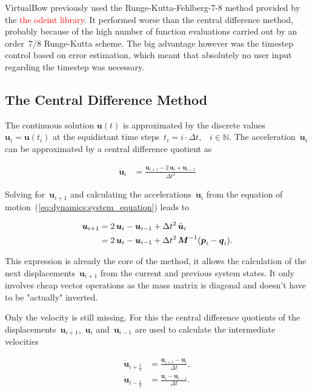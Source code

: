 VirtualBow previously used the Runge-Kutta-Fehlberg-7-8 method provided by the \textcolor{red}{the odeint library}.
It performed worse than the central difference method, probably because of the high number of function evaluations carried out by an order~7/8 Runge-Kutta scheme.
The big advantage however was the timestep control based on error estimation, which meant that absolutely no user input regarding the timestep was necessary.

\subsection{The Central Difference Method}

The continuous solution $\boldsymbol{u}(t)$ is approximated by the discrete values~$\boldsymbol{u}_i = \boldsymbol{u}(t_{i})$ at the equidistant time steps~$t_i = i\cdot\Delta t$,\ \ $i \in \mathbb{N}$.
The acceleration~$\ddot{\boldsymbol{u}}_i$ can be approximated by a central difference quotient as

\begin{align}
\ddot{\boldsymbol{u}}_i &= \frac{\boldsymbol{u}_{i+1} - 2\,\boldsymbol{u}_{i} + \boldsymbol{u}_{i-1}}{\Delta t^2}\label{eq:dynamics:difference_acceleration}
\end{align}

Solving for~$\boldsymbol{u}_{i+1}$ and calculating the accelerations~$\ddot{\boldsymbol{u}}_{i}$ from the equation of motion~(\ref{eq:dynamics:system_equation}) leads to

\begin{align}
\boldsymbol{u}_{i+1} &= 2\,\boldsymbol{u}_{i} - \boldsymbol{u}_{i-1} + \Delta t^2\,\ddot{\boldsymbol{u}}_{i}\notag\\
&= 2\,\boldsymbol{u}_{i} - \boldsymbol{u}_{i-1} + \Delta t^2\,\boldsymbol{M}^{-1}(\boldsymbol{p}_i - \boldsymbol{q}_i).
\end{align}

This expression is already the core of the method, it allows the calculation of the next displacements~$\boldsymbol{u}_{i+1}$ from the current and previous system states.
It only involves cheap vector operations as the mass matrix is diagonal and doesn't have to be "actually" inverted.

Only the velocity is still missing. For this the central difference quotients of the displacements~$\boldsymbol{u}_{i+1}$,~$\boldsymbol{u}_{i}$ and~$\boldsymbol{u}_{i-1}$ are used to calculate the intermediate velocities

\begin{align}
\dot{\boldsymbol{u}}_{i+\frac{1}{2}} &= \frac{\boldsymbol{u}_{i+1} - \boldsymbol{u}_{i}}{\Delta t},\\
\dot{\boldsymbol{u}}_{i-\frac{1}{2}} &= \frac{\boldsymbol{u}_{i} - \boldsymbol{u}_{i-1}}{\Delta t}.
\end{align} 

